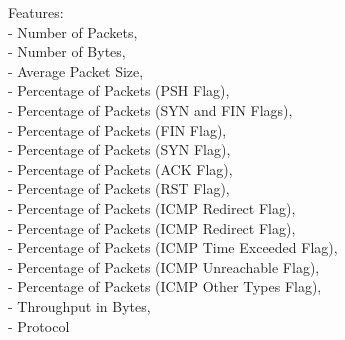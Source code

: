 
Features:\\
    - Number of Packets,\\
    - Number of Bytes,\\
    - Average Packet Size,\\
    - Percentage of Packets (PSH Flag),\\
    - Percentage of Packets (SYN and FIN Flags),\\
    - Percentage of Packets (FIN Flag),\\
    - Percentage of Packets (SYN Flag),\\
    - Percentage of Packets (ACK Flag),\\
    - Percentage of Packets (RST Flag),\\
    - Percentage of Packets (ICMP Redirect Flag),\\
    - Percentage of Packets (ICMP Redirect Flag),\\
    - Percentage of Packets (ICMP Time Exceeded Flag),\\
    - Percentage of Packets (ICMP Unreachable Flag),\\
    - Percentage of Packets (ICMP Other Types Flag),\\
    - Throughput in Bytes,\\
    - Protocol\\


